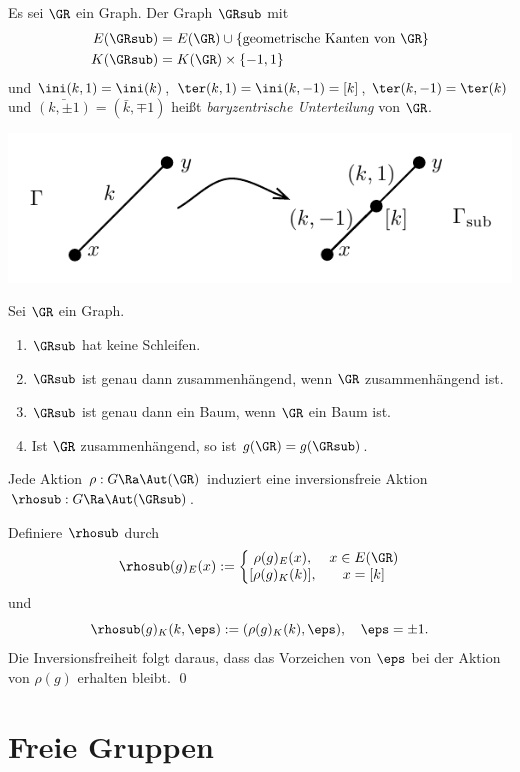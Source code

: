 \DEF Es sei $\GR$ ein Graph. Der Graph $\GRsub$ mit
\begin{align*}
E(\GRsub) &= E(\GR)\cup\{\text{geometrische Kanten von }\GR\} \\
K(\GRsub) &= K(\GR)\times\{-1,1\}
\end{align*}
und
$\ini(k,1)=\ini(k)$, $\ter(k,1)=\ini(k,-1)=[k]$,
$\ter(k,-1)=\ter(k)$ und $\bar{(k, \pm 1)}=(\bar{k},\mp 1)$
heißt \emph{baryzentrische Unterteilung}\index{$\GRsub$}
von $\GR$.
\begin{center}
	\includegraphics{grugraImages/subdiv}
\end{center}

\BEM Sei $\GR$ ein Graph.
\begin{enumerate}
\item $\GRsub$ hat keine Schleifen.
\item $\GRsub$ ist genau dann zusammenhängend, wenn $\GR$
	zusammenhängend ist.
\item $\GRsub$ ist genau dann ein Baum, wenn $\GR$ ein Baum ist.
\item Ist $\GR$ zusammenhängend, so ist $g(\GR)=g(\GRsub)$.
\end{enumerate}

\BEM Jede Aktion $\rho:G\Ra\Aut(\GR)$ induziert eine inversionsfreie
Aktion $\rhosub:G\Ra\Aut(\GRsub)$.

\bew Definiere $\rhosub$ durch
\[
\rhosub(g)_E(x) :=
\left\{\begin{matrix}
\rho(g)_E(x), & x\in E(\GR) \\
[\rho(g)_K(k)], & x=[k]
\end{matrix}\right.
\]
und
\[
\rhosub(g)_K(k,\eps) :=
(\rho(g)_K(k),\eps),
\quad \eps=\pm 1.
\]
Die Inversionsfreiheit folgt daraus, dass das Vorzeichen von $\eps$
bei der Aktion von $\rho(g)$ erhalten bleibt.
\qed

\section{Freie Gruppen}\label{sec_FG}

